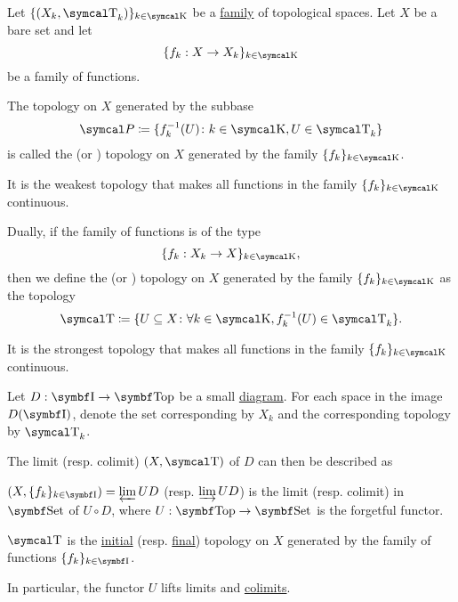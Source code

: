 \begin{definition}\label{def:initial_topology}
  Let \( \{ (X_k, \CT_k) \}_{k \in \CK} \) be a \hyperref[def:indexed_family]{family} of topological spaces. Let \( X \) be a bare set and let
  \begin{equation*}
    \{ f_k: X \to X_k \}_{k \in \CK}
  \end{equation*}
  be a family of functions.

  The topology on \( X \) generated by the subbase
  \begin{equation*}
    \Cal{P} \coloneqq \{ f_k^{-1}(U) \colon k \in \CK, U \in \CT_k \}
  \end{equation*}
  is called the  (or ) topology on \( X \) generated by the family \( \{ f_k \}_{k \in \CK} \).

  It is the weakest topology that makes all functions in the family \( \{ f_k \}_{k \in \CK} \) continuous.
\end{definition}

\begin{definition}\label{def:final_topology}
  Dually, if the family of functions is of the type
  \begin{equation*}
    \{ f_k: X_k \to X \}_{k \in \CK},
  \end{equation*}
  then we define the  (or ) topology on \( X \) generated by the family \( \{ f_k \}_{k \in \CK} \) as the topology
  \begin{equation*}
    \CT \coloneqq \{ U \subseteq X \colon \forall k \in \CK, f_k^{-1}(U) \in \CT_k \}.
  \end{equation*}

  It is the strongest topology that makes all functions in the family \( \{ f_k \}_{k \in \CK} \) continuous.
\end{definition}

\begin{proposition}\label{thm:initial_final_topology_limit}
  Let \( D: \Bold I \to \Cat{Top} \) be a small \hyperref[def:categorical_diagram]{diagram}. For each space in the image \( D(\Bold I) \), denote the set corresponding by \( X_k \) and the corresponding topology by \( \CT_k \).

  The limit (resp. colimit) \( (X, \CT) \) of \( D \) can then be described as
  \begin{DefEnum}
    \item \( (X, \{ f_k \}_{k \in \Cat{I}}) = \varprojlim UD \) (resp. \( \varinjlim UD \)) is the limit (resp. colimit) in \( \Cat{Set} \) of \( U \circ D \), where \( U: \Bold{Top} \to \Cat{Set} \) is the forgetful functor.
    \item \( \CT \) is the \hyperref[def:initial_topology]{initial} (resp. \hyperref[def:final_topology]{final}) topology on \( X \) generated by the family of functions \( \{ f_k \}_{k \in \Cat{I}} \).
  \end{DefEnum}

  In particular, the functor \( U \) lifts limits and \hyperref[def:categorical_limit_preservation/lift]{colimits}.
\end{proposition}

